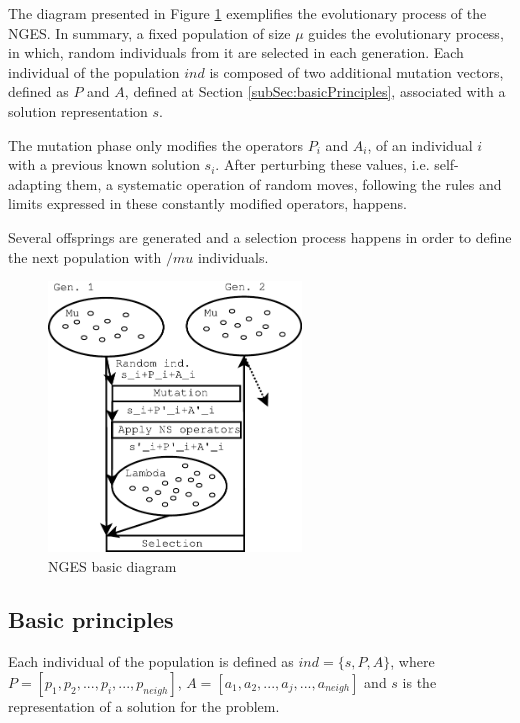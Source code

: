 \documentclass{endm}
\begin{document}
The diagram presented in Figure \ref{fig:NGESDiagram} exemplifies the evolutionary process of the NGES.
In summary, a fixed population of size $\mu$ guides the evolutionary process, in which, random individuals from it are selected in each generation.
Each individual of the population $ind$ is composed of two additional mutation vectors, defined as $P$ and $A$, defined at Section \ref{subSec:basicPrinciples}, associated with a solution representation $s$.

The mutation phase only modifies the operators $P_i$ and $A_i$, of an individual $i$ with a previous known solution $s_i$.
After perturbing these values, i.e. self-adapting them, a systematic operation of random moves, following the rules and limits expressed in these constantly modified operators, happens.

Several offsprings are generated and a selection process happens in order to define the next population with $/mu$ individuals.

\begin{figure}[htbp]
	\center
 	\includegraphics[width=0.6\textwidth]{./NGES_Diagram.pdf}
	\caption{NGES basic diagram} 
	\label{fig:NGESDiagram}
\end{figure}

\subsection{Basic principles \label{subSec:basicPrinciples}} 

Each individual of the population is defined as $ind  = \{ s, P, A \}$, where $P = [p_1, p_2, ..., p_i, ...,p_{neigh}]$, $A = [a_1, a_2, ..., a_j, ..., a_{neigh}]$ and $s$ is the representation of a solution for the problem.
\end{document}
